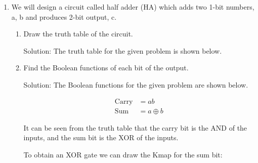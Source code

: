 \documentclass[table]{article}
\begin{document}
\begin{enumerate}
    \item We will design a circuit called half adder (HA) which adds two 1-bit numbers, a, b and
    produces 2-bit output, c.

    \begin{enumerate}[label=(\alph*)]
        \item Draw the truth table of the circuit.
        
        Solution: The truth table for the given problem is shown below. \\

        \begin{table}[H]
            \centering
            \caption{Truth Table for the given problem (Part 2a)}
            \label{tab:part2a}
        \end{table}

        \item Find the Boolean functions of each bit of the output.
        
        Solution: The Boolean functions for the given problem are shown below. 

        \begin{align}
            \text{Carry} &= ab \\
            \text{Sum} &= a \oplus b
        \end{align}

        It can be seen from the truth table that the carry bit is the AND of the inputs, and the sum bit is the XOR of the inputs.

        To obtain an XOR gate we can draw the Kmap for the sum bit:


\end{enumerate}
\end{enumerate}
\end{document}
